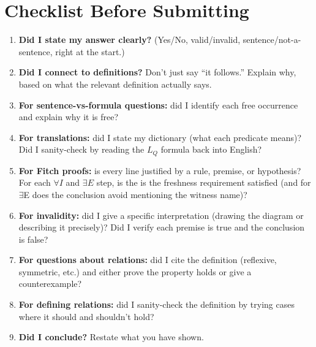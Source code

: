 \documentclass[11pt]{article}
\begin{document}
\section{Checklist Before Submitting}

\begin{enumerate}
    \item \textbf{Did I state my answer clearly?} (Yes/No, valid/invalid, sentence/not-a-sentence, right at the start.)
    \item \textbf{Did I connect to definitions?} Don't just say ``it follows.'' Explain why, based on what the relevant definition actually says.
    \item \textbf{For sentence-vs-formula questions:} did I identify each free occurrence and explain why it is free?
    \item \textbf{For translations:} did I state my dictionary (what each predicate means)? Did I sanity-check by reading the $L_Q$ formula back into English?
    \item \textbf{For Fitch proofs:} is every line justified by a rule, premise, or hypothesis? For each $\forall I$ and $\exists E$ step, is the is the freshness requirement satisfied (and for $\exists$E does the conclusion avoid mentioning the witness name)?
    \item \textbf{For invalidity:} did I give a specific interpretation (drawing the diagram or describing it precisely)? Did I verify each premise is true and the conclusion is false?
    \item \textbf{For questions about relations:} did I cite the definition (reflexive, symmetric, etc.) and either prove the property holds or give a counterexample?
    \item \textbf{For defining relations:} did I sanity-check the definition by trying cases where it should and shouldn't hold?
    \item \textbf{Did I conclude?} Restate what you have shown.
\end{enumerate}
\end{document}

